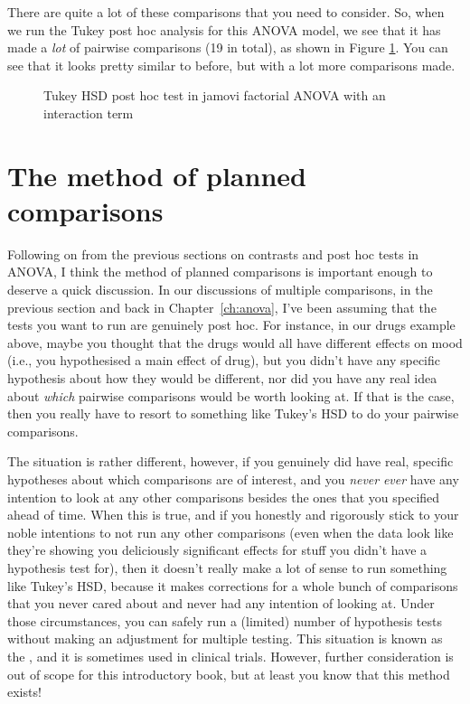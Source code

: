 There are quite a lot of these comparisons that you need to consider. So, when we run the Tukey post hoc analysis for this ANOVA model, we see that it has made a {\it lot} of pairwise comparisons (19 in total), as shown in Figure \ref{fig:factorialanova14}. You can see that it looks pretty similar to before, but with a lot more comparisons made.

\begin{figure}[!htb]
\begin{center}
\caption{Tukey HSD post hoc test in jamovi factorial ANOVA with an interaction term}
\label{fig:factorialanova14}
\HR
\end{center}
\end{figure}


\section{The method of planned comparisons\label{sec:plannedcomparisons}}

Following on from the previous sections on contrasts and post hoc tests in ANOVA, I think the method of planned comparisons is important enough to deserve a quick discussion. In our discussions of multiple comparisons, in the previous section and back in Chapter~\ref{ch:anova}, I've been assuming that the tests you want to run are genuinely post hoc. For instance, in our drugs example above, maybe you thought that the drugs would all have different effects on mood (i.e., you hypothesised a main effect of drug), but you didn't have any specific hypothesis about how they would be different, nor did you have any real idea about {\it which} pairwise comparisons would be worth looking at. If that is the case, then you really have to resort to something like Tukey's HSD to do your pairwise comparisons.

The situation is rather different, however, if you genuinely did have real, specific hypotheses about which comparisons are of interest, and you {\it never} {\it ever} have any intention to look at any other comparisons besides the ones that you specified ahead of time. When this is true, and if you honestly and rigorously stick to your noble intentions to not run any other comparisons (even when the data look like they're showing you deliciously significant effects for stuff you didn't have a hypothesis test for), then it doesn't really make a lot of sense to run something like Tukey's HSD, because it makes corrections for a whole bunch of comparisons that you never cared about and never had any intention of looking at. Under those circumstances, you can safely run a (limited) number of hypothesis tests without making an adjustment for multiple testing. This situation is known as the , and it is sometimes used in clinical trials. However, further consideration is out of scope for this introductory book, but at least you know that this method exists! 


